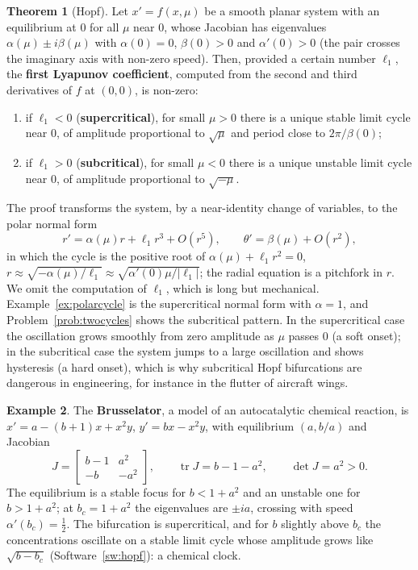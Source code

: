 \documentclass[11pt,a4paper]{article}
\numberwithin{equation}{section}
\DeclareMathOperator{\tr}{tr}
\theoremstyle{definition}
\newtheorem{thm}{Theorem}[subsection]
\newtheorem{exa}[thm]{Example}
\begin{document}
\begin{thm}[Hopf]
\label{thm:hopf}
Let $x' = f(x, \mu)$ be a smooth planar system with an equilibrium at $0$ for all $\mu$ near $0$, whose Jacobian has eigenvalues $\alpha(\mu) \pm i\beta(\mu)$ with $\alpha(0) = 0$, $\beta(0) > 0$ and $\alpha'(0) > 0$ (the pair crosses
the imaginary axis with non-zero speed). Then, provided a certain number $\ell_1$, the \textbf{first Lyapunov coefficient}, computed from the second and third derivatives of $f$ at $(0, 0)$, is non-zero:
\begin{enumerate}[label=(\roman*)]
\item if $\ell_1 < 0$ (\textbf{supercritical}), for small $\mu > 0$ there is a unique stable limit cycle near $0$, of amplitude proportional to $\sqrt\mu$ and period close to $2\pi/\beta(0)$;
\item if $\ell_1 > 0$ (\textbf{subcritical}), for small $\mu < 0$ there is a unique unstable limit cycle near $0$, of amplitude proportional to $\sqrt{-\mu}$.
\end{enumerate}
\end{thm}

The proof transforms the system, by a near-identity change of variables, to the polar normal form
\[
r' = \alpha(\mu)r + \ell_1r^3 + O(r^5), \qquad \theta' = \beta(\mu) + O(r^2) ,
\]
in which the cycle is the positive root of $\alpha(\mu) + \ell_1r^2 = 0$, $r \approx \sqrt{-\alpha(\mu)/\ell_1} \approx \sqrt{\alpha'(0)\mu/|\ell_1|}$; the radial equation is a pitchfork in $r$. We omit the computation of $\ell_1$, which is
long but mechanical. Example~\ref{ex:polarcycle} is the supercritical normal form with $\alpha = 1$, and Problem~\ref{prob:twocycles} shows the subcritical pattern. In the supercritical case the oscillation grows smoothly
from zero amplitude as $\mu$ passes $0$ (a soft onset); in the subcritical case the system jumps to a large oscillation and shows hysteresis (a hard onset), which is why subcritical Hopf
bifurcations are dangerous in engineering, for instance in the flutter of aircraft wings.

\begin{exa}
\label{ex:brusselator}
The \textbf{Brusselator}, a model of an autocatalytic chemical reaction, is $x' = a - (b + 1)x + x^2y$, $y' = bx - x^2y$, with equilibrium $(a, b/a)$ and Jacobian
\[
J = \begin{bmatrix} b - 1 & a^2\\ -b & -a^2\end{bmatrix}, \qquad \tr J = b - 1 - a^2, \qquad \det J = a^2 > 0 .
\]
The equilibrium is a stable focus for $b < 1 + a^2$ and an unstable one for $b > 1 + a^2$; at $b_c = 1 + a^2$ the eigenvalues are $\pm ia$, crossing with speed $\alpha'(b_c) = \frac12$. The bifurcation is supercritical, and for
$b$ slightly above $b_c$ the concentrations oscillate on a stable limit cycle whose amplitude grows like $\sqrt{b - b_c}$ (Software~\ref{sw:hopf}): a chemical clock.
\end{exa}
\end{document}
